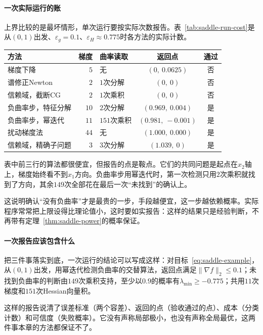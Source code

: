 \paragraph{一次实际运行的账}
上界比较的是最坏情形，单次运行要按实际次数报告。表~\ref{tab:saddle-run-cost}是从$(0,1)$出发、$\varepsilon_g=0.1$、$\varepsilon_H\approx0.775$时各方法的实际计数。

\begin{BookInlineTable}
  \centering
  \begin{tabular}{@{}lrlcc@{}}
    \toprule
    方法 & 梯度 & 曲率读取 & 返回点 & 通过\\
    \midrule
    梯度下降 & $5$ & 无 & $(0,\ 0.0625)$ & 否\\
    谱修正Newton & $2$ & $1$次分解 & $(0,\ 0)$ & 否\\
    信赖域，截断CG & $2$ & $1$次乘积 & $(0,\ 0)$ & 否\\
    负曲率步，特征分解 & $10$ & $2$次分解 & $(0.969,\ 0.004)$ & 是\\
    负曲率步，幂迭代 & $11$ & $151$次乘积 & $(0.981,\ -0.001)$ & 是\\
    扰动梯度法 & $44$ & 无 & $(1.000,\ 0.000)$ & 是\\
    信赖域，精确子问题 & $3$ & $3$次分解 & $(1.039,\ 0)$ & 是\\
    \bottomrule
  \end{tabular}
  \caption{从$(0,1)$出发的实际计数，“通过”指是否满足式~\eqref{eq:saddle-approximate}。幂迭代用$L=2$，随机起点的种子固定为$0$，检测精度$\varepsilon_H/2$，失败概率$\delta=0.05$（两次检测的总失败概率约$0.1$），上限由式~\eqref{eq:saddle-power-rounds}算得$149$次。}
  \label{tab:saddle-run-cost}
\end{BookInlineTable}

表中前三行的算法都很便宜，但报告的点是鞍点。它们的共同问题是起点在$x_2$轴上，梯度始终看不到$x_1$方向。负曲率步用幂迭代时，第一次检测只用$2$次乘积就找到了方向，其余$149$次全部花在最后一次“未找到”的确认上。

这说明确认“没有负曲率”才是最贵的一步，手段越便宜，这一步越依赖概率。实际程序常常把上限设得比理论值小，这时要如实报告：这样的结果只是经验判断，不再带有定理~\ref{thm:saddle-power}的概率保证。

\paragraph{一次报告应该包含什么}
把三件事落实到底，一次运行的结论可以写成这样：对目标~\eqref{eq:saddle-example}，从$(0,1)$出发，用幂迭代检测负曲率的交替算法，返回点满足$\lVert\nabla f\rVert_2\leq0.1$；未找到负曲率的判断由$149$次乘积支持，至少以$0.9$的概率有$\lambda_{\min}\geq-0.775$；共用$11$次梯度和$151$次Hessian向量积。

这样的报告说清了误差标准（两个容差）、返回的点（验收通过的点）、成本（分类计数）和可信度（失败概率）。它没有声称局部极小，也没有声称全局最优，这两件事本章的方法都保证不了。

